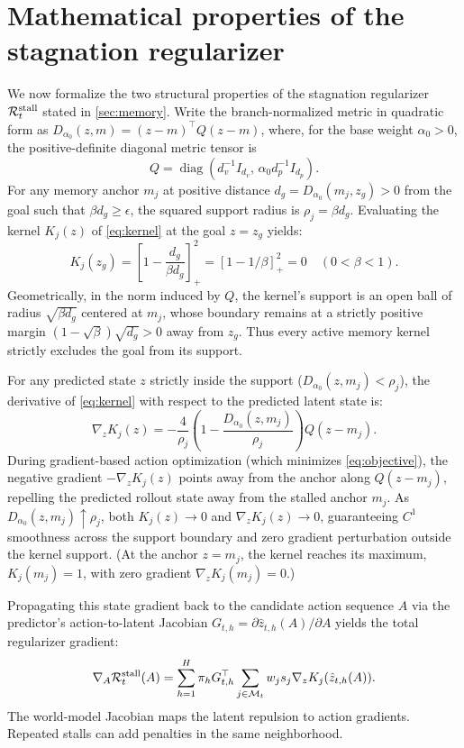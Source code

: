 \section{Mathematical properties of the stagnation regularizer}
\label{sec:properties}
We now formalize the two structural properties of the stagnation regularizer $\mathcal R_t^{\rm stall}$ stated in \cref{sec:memory}. Write the branch-normalized metric in quadratic form as $D_{\alpha_0}(z,m)=(z-m)^\top Q(z-m)$, where, for the base weight $\alpha_0>0$, the positive-definite diagonal metric tensor is
\begin{equation}
 Q=\operatorname{diag}\!\left(d_v^{-1}I_{d_v},\,
 \alpha_0d_p^{-1}I_{d_p}\right).
\end{equation}
For any memory anchor $m_j$ at positive distance $d_g=D_{\alpha_0}(m_j,z_g)>0$ from the goal such that $\beta d_g\geq\epsilon$, the squared support radius is $\rho_j=\beta d_g$. Evaluating the kernel $K_j(z)$ of \cref{eq:kernel} at the goal $z=z_g$ yields:
\begin{equation}
 K_j(z_g)=\left[1-\frac{d_g}{\beta d_g}\right]_+^2=[1-1/\beta]_+^2=0\quad(0<\beta<1).
\end{equation}
Geometrically, in the norm induced by $Q$, the kernel's support is an open ball of radius $\sqrt{\beta d_g}$ centered at $m_j$, whose boundary remains at a strictly positive margin $(1-\sqrt{\beta})\sqrt{d_g}>0$ away from $z_g$. Thus every active memory kernel strictly excludes the goal from its support.

For any predicted state $z$ strictly inside the support ($D_{\alpha_0}(z,m_j)<\rho_j$), the derivative of \cref{eq:kernel} with respect to the predicted latent state is:
\begin{equation}
 \nabla_zK_j(z)=-\frac{4}{\rho_j}
 \left(1-\frac{D_{\alpha_0}(z,m_j)}{\rho_j}\right)Q(z-m_j).
 \label{eq:kernelgradient}
\end{equation}
During gradient-based action optimization (which minimizes \cref{eq:objective}), the negative gradient $-\nabla_z K_j(z)$ points away from the anchor along $Q(z-m_j)$, repelling the predicted rollout state away from the stalled anchor $m_j$. As $D_{\alpha_0}(z,m_j)\uparrow\rho_j$, both $K_j(z)\to 0$ and $\nabla_z K_j(z)\to 0$, guaranteeing $C^1$ smoothness across the support boundary and zero gradient perturbation outside the kernel support. (At the anchor $z=m_j$, the kernel reaches its maximum, $K_j(m_j)=1$, with zero gradient $\nabla_z K_j(m_j)=0$.)

Propagating this state gradient back to the candidate action sequence $A$ via the predictor's action-to-latent Jacobian $G_{t,h}=\partial\hat z_{t,h}(A)/\partial A$ yields the total regularizer gradient:
\begin{equation}
 \nabla_A\mathcal R_t^{\rm stall}(A)=
 \sum_{h=1}^{H}\pi_h G_{t,h}^{\top}
 \sum_{j\in\mathcal M_t}w_js_j\nabla_zK_j(\hat z_{t,h}(A)).
\end{equation}
The world-model Jacobian maps the latent repulsion to action gradients. Repeated stalls can add penalties in the same neighborhood.

